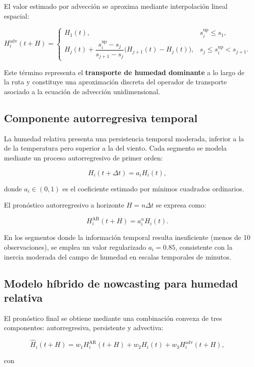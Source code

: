 \documentclass[
  spanish,
  us-letterpaper,
]{scrreprt}
\numberwithin{equation}{section}
\begin{document}
El valor estimado por advección se aproxima mediante interpolación
lineal espacial:

\[
H_i^{\text{adv}}(t+H) =
\begin{cases}
H_1(t), & s_i^{\text{up}} \le s_1, \\[6pt]
H_j(t) + \dfrac{s_i^{\text{up}} - s_j}{s_{j+1}-s_j}\bigl(H_{j+1}(t)-H_j(t)\bigr), & s_j \le s_i^{\text{up}} < s_{j+1}.
\end{cases}
\]

Este término representa el \textbf{transporte de humedad dominante} a lo
largo de la ruta y constituye una aproximación discreta del operador de
transporte asociado a la ecuación de advección unidimensional.

\subsection{Componente autorregresiva
temporal}\label{componente-autorregresiva-temporal-2}

La humedad relativa presenta una persistencia temporal moderada,
inferior a la de la temperatura pero superior a la del viento. Cada
segmento se modela mediante un proceso autorregresivo de primer orden:

\[
H_i(t+\Delta t) = a_i H_i(t),
\]

donde \(a_i \in (0,1)\) es el coeficiente estimado por mínimos cuadrados
ordinarios.

El pronóstico autorregresivo a horizonte \(H = n\Delta t\) se expresa
como:

\[
H_i^{\text{AR}}(t+H) = a_i^{n} H_i(t).
\]

En los segmentos donde la información temporal resulta insuficiente
(menos de 10 observaciones), se emplea un valor regularizado
\(a_i = 0.85\), consistente con la inercia moderada del campo de humedad
en escalas temporales de minutos.

\subsection{Modelo híbrido de nowcasting para humedad
relativa}\label{modelo-huxedbrido-de-nowcasting-para-humedad-relativa}

El pronóstico final se obtiene mediante una combinación convexa de tres
componentes: autorregresiva, persistente y advectiva:

\[
\hat{H}_i(t+H) = w_1 H_i^{\text{AR}}(t+H) + w_2 H_i(t) + w_3 H_i^{\text{adv}}(t+H),
\]

con
\end{document}
